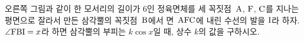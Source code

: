 \noindent\begin{minipage}[t]{0.58\linewidth}\vspace{0pt}\raggedright 오른쪽 그림과 같이 한 모서리의 길이가 $6$인 정육면체를 세 꼭짓점~$\mathrm{A}$, $\mathrm{F}$, $\mathrm{C}$를 지나는 평면으로 잘라서 만든 삼각뿔의 꼭짓점~$\mathrm{B}$에서 면~$\mathrm{AFC}$에 내린 수선의 발을 $\mathrm{I}$라 하자. $\angle\mathrm{FBI}=x$라 하면 삼각뿔의 부피는 $k\cos x$일 때, 상수 $k$의 값을 구하시오.\end{minipage}\hfill\begin{minipage}[t]{0.4\linewidth}\vspace{0pt}\centering \resizebox{\ifdim\width>\linewidth\linewidth\else\width\fi}{!}{}\end{minipage}\par
